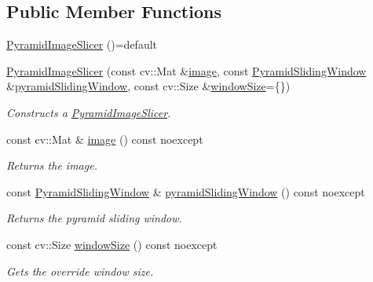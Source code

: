 \subsection*{Public Member Functions}
\begin{DoxyCompactItemize}
\item 
\hyperlink{classdg_1_1deepcore_1_1imagery_1_1_pyramid_image_slicer_afda636f2eb248c25c5fb6272a4f429f3}{Pyramid\+Image\+Slicer} ()=default
\item 
\hyperlink{group___imagery_module_gaaebf1aa82f6ff98fd3eb8c65544c7ce1}{Pyramid\+Image\+Slicer} (const cv\+::\+Mat \&\hyperlink{group___imagery_module_ga90b67bc2fa06b73b89d73c8216931bc9}{image}, const \hyperlink{classdg_1_1deepcore_1_1imagery_1_1_pyramid_sliding_window}{Pyramid\+Sliding\+Window} \&\hyperlink{group___imagery_module_ga7558b54bb237cddcf03b4442471c06ef}{pyramid\+Sliding\+Window}, const cv\+::\+Size \&\hyperlink{classdg_1_1deepcore_1_1imagery_1_1_pyramid_image_slicer_a45ac8a7e2c3eb4941f3aabf7d8dd6165}{window\+Size}=\{\})
\begin{DoxyCompactList}\small\item\em Constructs a \hyperlink{classdg_1_1deepcore_1_1imagery_1_1_pyramid_image_slicer}{Pyramid\+Image\+Slicer}. \end{DoxyCompactList}\item 
const cv\+::\+Mat \& \hyperlink{group___imagery_module_ga90b67bc2fa06b73b89d73c8216931bc9}{image} () const noexcept
\begin{DoxyCompactList}\small\item\em Returns the image. \end{DoxyCompactList}\item 
const \hyperlink{classdg_1_1deepcore_1_1imagery_1_1_pyramid_sliding_window}{Pyramid\+Sliding\+Window} \& \hyperlink{group___imagery_module_ga7558b54bb237cddcf03b4442471c06ef}{pyramid\+Sliding\+Window} () const noexcept
\begin{DoxyCompactList}\small\item\em Returns the pyramid sliding window. \end{DoxyCompactList}\item 
const cv\+::\+Size \hyperlink{classdg_1_1deepcore_1_1imagery_1_1_pyramid_image_slicer_a45ac8a7e2c3eb4941f3aabf7d8dd6165}{window\+Size} () const noexcept
\begin{DoxyCompactList}\small\item\em Gets the override window size. \end{DoxyCompactList}\item 

\end{DoxyCompactItemize}
